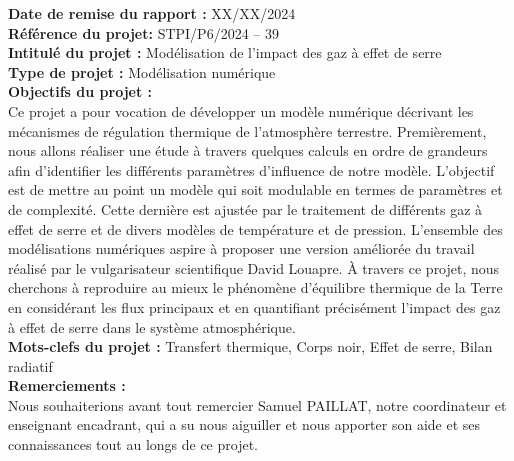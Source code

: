 \documentclass[a4paper, 12pt]{report} %
\begin{document}

\newpage
{}
\setcounter{page}{1}
\thispagestyle{empty}
\null


\newpage
\pagestyle{special}

\textbf{Date de remise du rapport :} XX/XX/2024 \\

\textbf{Référence du projet:} STPI/P6/2024 – 39 \\

\textbf{Intitulé du projet :} Modélisation de l'impact des gaz à effet de serre \\

\textbf{Type de projet :} Modélisation numérique \\

\textbf{Objectifs du projet :} \\ 

Ce projet a pour vocation de développer un modèle numérique 
décrivant les mécanismes de régulation thermique de 
l'atmosphère terrestre. Premièrement, nous allons réaliser
une étude à travers quelques calculs en ordre de grandeurs afin
d'identifier les différents paramètres d'influence de notre modèle.
L'objectif est de mettre au point un modèle qui soit modulable
en termes de paramètres et de complexité. Cette dernière est 
ajustée par le traitement de différents gaz à effet de serre 
et de divers modèles de température et de pression. 
L'ensemble des modélisations numériques aspire à proposer 
une version améliorée du travail réalisé par le 
vulgarisateur scientifique David Louapre. À travers ce projet, 
nous cherchons à reproduire au mieux le 
phénomène d'équilibre thermique de la Terre en considérant 
les flux principaux et en quantifiant précisément l'impact
des gaz à effet de serre dans le système atmosphérique. \\

\textbf{Mots-clefs du projet :} Transfert thermique, Corps noir, Effet de serre, Bilan radiatif \\ 


\vfill
\textbf{Remerciements :} \\
	
	\setlength{\parindent}{30pt}
	Nous souhaiterions avant tout remercier Samuel PAILLAT, notre
	coordinateur et enseignant encadrant, qui a su nous aiguiller
	et nous apporter son aide et ses connaissances tout au longs
	de ce projet. \\
\end{document}
